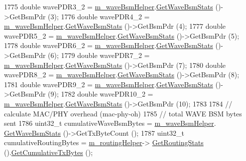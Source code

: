 \begin{DoxyCode}
1775   \textcolor{keywordtype}{double} wavePDR3\_2 = \hyperlink{classVanetRoutingExperiment_a690b550804fc4c9bcfab6b8ae40e4728}{m\_waveBsmHelper}.\hyperlink{classns3_1_1WaveBsmHelper_a7b7442d597cc104a22c8c4bef6c98c6e}{GetWaveBsmStats} ()->GetBsmPdr (3);
1776   \textcolor{keywordtype}{double} wavePDR4\_2 = \hyperlink{classVanetRoutingExperiment_a690b550804fc4c9bcfab6b8ae40e4728}{m\_waveBsmHelper}.\hyperlink{classns3_1_1WaveBsmHelper_a7b7442d597cc104a22c8c4bef6c98c6e}{GetWaveBsmStats} ()->GetBsmPdr (4);
1777   \textcolor{keywordtype}{double} wavePDR5\_2 = \hyperlink{classVanetRoutingExperiment_a690b550804fc4c9bcfab6b8ae40e4728}{m\_waveBsmHelper}.\hyperlink{classns3_1_1WaveBsmHelper_a7b7442d597cc104a22c8c4bef6c98c6e}{GetWaveBsmStats} ()->GetBsmPdr (5);
1778   \textcolor{keywordtype}{double} wavePDR6\_2 = \hyperlink{classVanetRoutingExperiment_a690b550804fc4c9bcfab6b8ae40e4728}{m\_waveBsmHelper}.\hyperlink{classns3_1_1WaveBsmHelper_a7b7442d597cc104a22c8c4bef6c98c6e}{GetWaveBsmStats} ()->GetBsmPdr (6);
1779   \textcolor{keywordtype}{double} wavePDR7\_2 = \hyperlink{classVanetRoutingExperiment_a690b550804fc4c9bcfab6b8ae40e4728}{m\_waveBsmHelper}.\hyperlink{classns3_1_1WaveBsmHelper_a7b7442d597cc104a22c8c4bef6c98c6e}{GetWaveBsmStats} ()->GetBsmPdr (7);
1780   \textcolor{keywordtype}{double} wavePDR8\_2 = \hyperlink{classVanetRoutingExperiment_a690b550804fc4c9bcfab6b8ae40e4728}{m\_waveBsmHelper}.\hyperlink{classns3_1_1WaveBsmHelper_a7b7442d597cc104a22c8c4bef6c98c6e}{GetWaveBsmStats} ()->GetBsmPdr (8);
1781   \textcolor{keywordtype}{double} wavePDR9\_2 = \hyperlink{classVanetRoutingExperiment_a690b550804fc4c9bcfab6b8ae40e4728}{m\_waveBsmHelper}.\hyperlink{classns3_1_1WaveBsmHelper_a7b7442d597cc104a22c8c4bef6c98c6e}{GetWaveBsmStats} ()->GetBsmPdr (9);
1782   \textcolor{keywordtype}{double} wavePDR10\_2 = \hyperlink{classVanetRoutingExperiment_a690b550804fc4c9bcfab6b8ae40e4728}{m\_waveBsmHelper}.\hyperlink{classns3_1_1WaveBsmHelper_a7b7442d597cc104a22c8c4bef6c98c6e}{GetWaveBsmStats} ()->GetBsmPdr (10);
1783 
1784   \textcolor{comment}{// calculate MAC/PHY overhead (mac-phy-oh)}
1785   \textcolor{comment}{// total WAVE BSM bytes sent}
1786   uint32\_t cumulativeWaveBsmBytes = \hyperlink{classVanetRoutingExperiment_a690b550804fc4c9bcfab6b8ae40e4728}{m\_waveBsmHelper}.
      \hyperlink{classns3_1_1WaveBsmHelper_a7b7442d597cc104a22c8c4bef6c98c6e}{GetWaveBsmStats} ()->GetTxByteCount ();
1787   uint32\_t cumulativeRoutingBytes = \hyperlink{classVanetRoutingExperiment_afbd666dc1310ae1903438ab9073409d5}{m\_routingHelper}->
      \hyperlink{classRoutingHelper_ae3bfcf80989af6e77fa131d5787302c5}{GetRoutingStats} ().\hyperlink{classRoutingStats_ac3553f60b36e358540d8f21a91f20a4b}{GetCumulativeTxBytes} ();

\end{DoxyCode}
